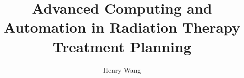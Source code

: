 \documentclass[12pt,openright,twoside]{report}
\begin{document}
    \title{Advanced Computing and Automation in Radiation Therapy Treatment Planning}
    \author{Henry Wang}
    
\beforepreface



\newpage



\afterpreface














\end{document}
